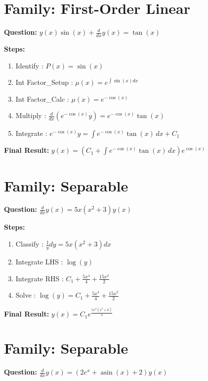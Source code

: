 \documentclass{article}
\begin{document}
\section*{Family: First-Order Linear}
\textbf{Question:} $y{\left(x \right)} \sin{\left(x \right)} + \frac{d}{d x} y{\left(x \right)} = \tan{\left(x \right)}$

\textbf{Steps:}
\begin{enumerate}
\item Identify :  $P(x) = \sin{\left(x \right)}$
\item Int Factor_Setup :  $\mu(x) = e^{\int \sin{\left(x \right)} dx}$
\item Int Factor_Calc :  $\mu(x) = e^{- \cos{\left(x \right)}}$
\item Multiply :  $\frac{d}{dx}(e^{- \cos{\left(x \right)}}y) = e^{- \cos{\left(x \right)}} \tan{\left(x \right)}$
\item Integrate :  $e^{- \cos{\left(x \right)}}y = \int e^{- \cos{\left(x \right)}} \tan{\left(x \right)}\, dx + C_1$
\end{enumerate}
\textbf{Final Result:} $y{\left(x \right)} = \left(C_{1} + \int e^{- \cos{\left(x \right)}} \tan{\left(x \right)}\, dx\right) e^{\cos{\left(x \right)}}$

\section*{Family: Separable}
\textbf{Question:} $\frac{d}{d x} y{\left(x \right)} = 5 x \left(x^{2} + 3\right) y{\left(x \right)}$

\textbf{Steps:}
\begin{enumerate}
\item Classify :  $\frac{1}{y} dy = 5 x \left(x^{2} + 3\right) dx$
\item Integrate LHS :  $\log{\left(y \right)}$
\item Integrate RHS :  $C_{1} + \frac{5 x^{4}}{4} + \frac{15 x^{2}}{2}$
\item Solve :  $\log{\left(y \right)} = C_{1} + \frac{5 x^{4}}{4} + \frac{15 x^{2}}{2}$
\end{enumerate}
\textbf{Final Result:} $y{\left(x \right)} = C_{1} e^{\frac{5 x^{2} \left(x^{2} + 6\right)}{4}}$

\section*{Family: Separable}
\textbf{Question:} $\frac{d}{d x} y{\left(x \right)} = \left(2 e^{x} + \operatorname{asin}{\left(x \right)} + 2\right) y{\left(x \right)}$
\end{document}
